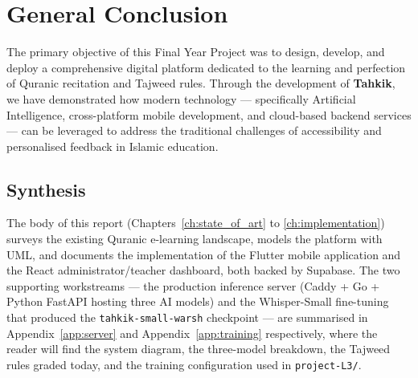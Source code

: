 \chapter*{General Conclusion}
\label{ch:general_conclusion}

The primary objective of this Final Year Project was to design, develop,
and deploy a comprehensive digital platform dedicated to the learning and
perfection of Quranic recitation and Tajweed rules. Through the
development of \textbf{Tahkik}, we have demonstrated how modern technology
--- specifically Artificial Intelligence, cross-platform mobile
development, and cloud-based backend services --- can be leveraged to
address the traditional challenges of accessibility and personalised
feedback in Islamic education.

\section*{Synthesis}

The body of this report (Chapters~\ref{ch:state_of_art} to
\ref{ch:implementation}) surveys the existing Quranic e-learning
landscape, models the platform with UML, and documents the
implementation of the Flutter mobile application and the React
administrator/teacher dashboard, both backed by Supabase. The two
supporting workstreams --- the production inference server (Caddy + Go
+ Python FastAPI hosting three AI models) and the Whisper-Small
fine-tuning that produced the \texttt{tahkik-small-warsh} checkpoint
--- are summarised in Appendix~\ref{app:server} and
Appendix~\ref{app:training} respectively, where the reader will find
the system diagram, the three-model breakdown, the Tajweed rules
graded today, and the training configuration used in
\texttt{project-L3/}.

